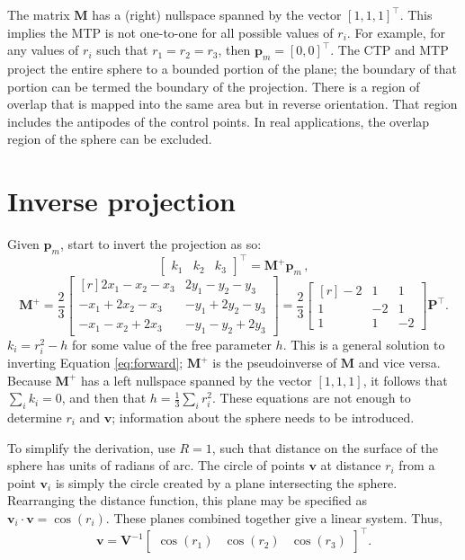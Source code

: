 \documentclass[]{interact}
\begin{document}
The matrix $\mathbf M$ has a (right) nullspace spanned by the vector
$[1, 1, 1]^\top$. This implies the MTP is not one-to-one for all possible values
of $r_i$. For example, for any values of $r_i$ such that $r_1 = r_2 = r_3$, then
$\mathbf p_m = [0, 0]^\top$. The CTP and MTP project the entire sphere to a
bounded portion of the plane; the boundary of that portion can be termed the
boundary of the projection. There is a region of overlap that is mapped into
the same area but in reverse orientation.
That region includes the antipodes of the control points.
In real applications, the overlap region of the sphere can be excluded.

\section{Inverse projection}
Given $\mathbf p_m$, start to invert the projection as so:
\begin{equation}\label{eq:inverse}
\begin{bmatrix*} k_1 & k_2 & k_3
\end{bmatrix*}^\top = \mathbf M^+ \mathbf p_m \,,
\end{equation}
\begin{equation}\label{eq:inversem}%
\mathbf M^+ = \frac{2}{3}
\begin{bmatrix*}[r] 2x_1 - x_2 - x_3 & 2y_1 - y_2 - y_3 \\
-x_1 + 2x_2 - x_3 & -y_1 + 2y_2 - y_3 \\
-x_1 - x_2 + 2x_3 & -y_1 - y_2 + 2y_3
\end{bmatrix*} = \frac{2}{3}
\begin{bmatrix*}[r] -2 & 1 & 1 \\
1 & -2 & 1 \\
1 & 1 & -2
\end{bmatrix*}
\mathbf P^\top .
\end{equation}
$k_i = r^2_i - h$ for some value of the free parameter $h$. This is a general
solution to inverting Equation \ref{eq:forward}; $\mathbf M^+$ is the
pseudoinverse of $\mathbf M$ and vice versa. Because $\mathbf M^+$ has a left
nullspace spanned by the vector $[1, 1, 1]$, it follows that $\sum_i k_i = 0$,
and then that $h = \frac{1}{3}\sum_i r^2_i$.
These equations are not enough to determine $r_i$ and $\mathbf v$;
information about the sphere needs to be introduced.

To simplify the derivation, use $R=1$, such that distance on the surface of the
sphere has units of radians of arc. The circle of points $\mathbf v$ at
distance $r_i$ from a point $\mathbf v_i$ is simply the circle created by a
plane intersecting the sphere. Rearranging the distance function, this plane
may be specified as $\mathbf v_i \cdot \mathbf v = \cos\left(r_i\right).$
These planes combined together give a linear system. Thus,
\begin{equation}\label{eq:inversev}
  \mathbf v = \mathbf V^{-1} \begin{bmatrix*} \cos\left(r_1\right) &
  \cos\left(r_2\right) &
  \cos\left(r_3\right)
  \end{bmatrix*}^\top .
\end{equation}
\end{document}
